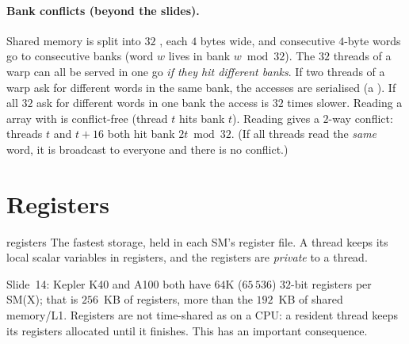 \paragraph{Bank conflicts (beyond the slides).}
Shared memory is split into $32$ , each $4$ bytes wide, and consecutive $4$-byte words go to consecutive banks (word $w$ lives in bank $w\bmod32$). The $32$ threads of a warp can all be served in one go \emph{if they hit different banks}.
If two threads of a warp ask for different words in the same bank, the accesses are serialised (a ). If all $32$ ask for different words in one bank the access is $32$ times slower.
Reading a  array with  is conflict-free (thread $t$ hits bank $t$). Reading  gives a $2$-way conflict: threads $t$ and $t+16$ both hit bank $2t\bmod32$. (If all threads read the \emph{same} word, it is broadcast to everyone and there is no conflict.)

\section{Registers}


\begin{definition}{registers}
The fastest storage, held in each SM's register file. A thread keeps its local scalar variables in registers, and the registers are \emph{private} to a thread.
\end{definition}
Slide~14: Kepler K40 and A100 both have $64$K ($65\,536$) $32$-bit registers per SM(X); that is $256$~KB of registers, more than the $192$~KB of shared memory/L1.
Registers are not time-shared as on a CPU: a resident thread keeps its registers allocated until it finishes. This has an important consequence.

